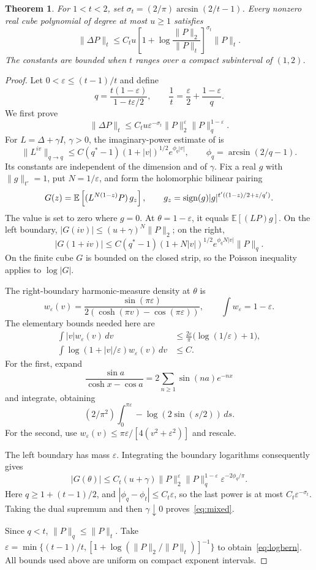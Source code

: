 \documentclass[11pt]{article}
\newtheorem{theorem}{Theorem}[section]
\theoremstyle{remark}\newtheorem{remark}[theorem]{Remark}
\newcommand{\E}{\mathbb E}\newcommand{\Prb}{\mathbb P}
\newcommand{\1}{\mathbf 1}\newcommand{\norm}[2]{\lVert #1\rVert_{#2}}
\begin{document}
\begin{theorem}\label{thm:log}
For $1<t<2$, set $\sigma_t=(2/\pi)\arcsin(2/t-1)$. Every nonzero real cube polynomial of degree at most $u\ge1$ satisfies
\begin{equation}\label{eq:logbern}
 \norm{\Delta P}t\le C_t u
 \left[1+\log\frac{\norm P2}{\norm Pt}\right]^{\sigma_t}\norm Pt.
\end{equation}
The constants are bounded when $t$ ranges over a compact subinterval of $(1,2)$.
\end{theorem}
\begin{proof}
Let $0<\varepsilon\le(t-1)/t$ and define
\[
 q=\frac{t(1-\varepsilon)}{1-t\varepsilon/2},\qquad
 \frac1t=\frac\varepsilon2+\frac{1-\varepsilon}{q}.
\]
We first prove
\begin{equation}\label{eq:mixed}
 \norm{\Delta P}t\le C_tu\varepsilon^{-\sigma_t}
 \norm P2^\varepsilon\norm Pq^{1-\varepsilon}.
\end{equation}
For $L=\Delta+\gamma I$, $\gamma>0$, the imaginary-power estimate of \cite[Proposition 11]{CD} is
\[
 \norm{L^{iv}}{q\to q}\le C(q^*-1)(1+|v|)^{1/2}
 e^{\phi_q|v|},\qquad \phi_q=\arcsin(2/q-1).
\]
Its constants are independent of the dimension and of $\gamma$. Fix a real $g$ with $\norm g{t'}=1$, put $N=1/\varepsilon$, and form the holomorphic bilinear pairing
\[
 G(z)=\E\left[(L^{N(1-z)}P)\,g_z\right],\qquad
 g_z=\sgn(g)|g|^{t'((1-z)/2+z/q')}.
\]
The value is set to zero where $g=0$. At $\theta=1-\varepsilon$, it equals $\E[(LP)g]$. On the left boundary,
$|G(iv)|\le(u+\gamma)^N\norm P2$; on the right,
\[
 |G(1+iv)|\le C(q^*-1)(1+N|v|)^{1/2}
 e^{\phi_qN|v|}\norm Pq.
\]
On the finite cube $G$ is bounded on the closed strip, so the Poisson inequality applies to $\log|G|$.

The right-boundary harmonic-measure density at $\theta$ is
\[
 w_\varepsilon(v)=\frac{\sin(\pi\varepsilon)}{2(\cosh(\pi v)-\cos(\pi\varepsilon))},
 \qquad \int w_\varepsilon=1-\varepsilon.
\]
The elementary bounds needed here are
\begin{align*}
 \int |v|w_\varepsilon(v)\,dv
 &\le\frac{2\varepsilon}{\pi}\bigl(\log(1/\varepsilon)+1\bigr),\\
 \int\log(1+|v|/\varepsilon)w_\varepsilon(v)\,dv&\le C.
\end{align*}
For the first, expand
\[\frac{\sin a}{\cosh x-\cos a}=2\sum_{n\ge1}\sin(na)e^{-nx}\]
and integrate, obtaining
\[(2/\pi^2)\int_0^{\pi\varepsilon}-\log(2\sin(s/2))\,ds.\]
For the second, use $w_\varepsilon(v)\le\pi\varepsilon/[4(v^2+\varepsilon^2)]$ and rescale.

The left boundary has mass $\varepsilon$. Integrating the boundary logarithms consequently gives
\[
 |G(\theta)|\le C_t(u+\gamma)
 \norm P2^\varepsilon\norm Pq^{1-\varepsilon}
 \varepsilon^{-2\phi_q/\pi}.
\]
Here $q\ge1+(t-1)/2$, and $|\phi_q-\phi_t|\le C_t\varepsilon$, so the last power is at most $C_t\varepsilon^{-\sigma_t}$. Taking the dual supremum and then $\gamma\downarrow0$ proves~\eqref{eq:mixed}.

Since $q<t$, $\norm Pq\le\norm Pt$. Take
$\varepsilon=\min\{(t-1)/t,[1+\log(\norm P2/\norm Pt)]^{-1}\}$ to obtain~\eqref{eq:logbern}. All bounds used above are uniform on compact exponent intervals.
\end{proof}
\end{document}

